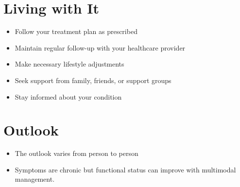 \section{Living with It}
\begin{itemize}[noitemsep]
  \item Follow your treatment plan as prescribed
  \item Maintain regular follow-up with your healthcare provider
  \item Make necessary lifestyle adjustments
  \item Seek support from family, friends, or support groups
  \item Stay informed about your condition
\end{itemize}
\section{Outlook}
\begin{itemize}[noitemsep]
  \item The outlook varies from person to person
  \item Symptoms are chronic but functional status can improve with multimodal management.
\end{itemize}
